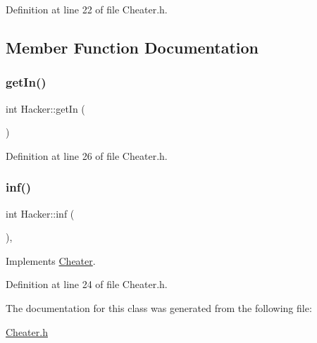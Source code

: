 Definition at line 22 of file Cheater.\+h.



\subsection{Member Function Documentation}
\hypertarget{class_hacker_ad03458f6342db62d108acabebe33a4a9}{}\label{class_hacker_ad03458f6342db62d108acabebe33a4a9} 
\subsubsection{\texorpdfstring{get\+In()}{getIn()}}
{\footnotesize\ttfamily int Hacker\+::get\+In (\begin{DoxyParamCaption}{ }\end{DoxyParamCaption})\hspace{0.3cm}{\ttfamily [inline]}}



Definition at line 26 of file Cheater.\+h.

\hypertarget{class_hacker_ad55877a5c4ad1020fee175d1809093e4}{}\label{class_hacker_ad55877a5c4ad1020fee175d1809093e4} 
\subsubsection{\texorpdfstring{inf()}{inf()}}
{\footnotesize\ttfamily int Hacker\+::inf (\begin{DoxyParamCaption}{ }\end{DoxyParamCaption})\hspace{0.3cm}{\ttfamily [inline]}, {\ttfamily [virtual]}}



Implements \hyperlink{class_cheater_af7f2736e09639dc3c6f7e371486bae8d}{Cheater}.



Definition at line 24 of file Cheater.\+h.



The documentation for this class was generated from the following file\+:\begin{DoxyCompactItemize}
\item 
\hyperlink{_cheater_8h}{Cheater.\+h}\end{DoxyCompactItemize}
